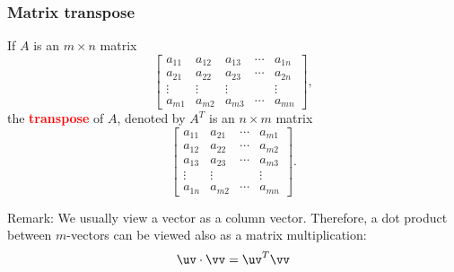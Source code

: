 \begin{frame}
  \frametitle{Matrix transpose}

  If $A$ is an $m\times n$ matrix
  {\footnotesize
  \[
  \left[
  \begin{array}{ccccc}
    a_{11} & a_{12} & a_{13} & \cdots & a_{1n} \\
    a_{21} & a_{22} & a_{23} & \cdots & a_{2n} \\
    \vdots & \vdots & \vdots & & \vdots \\
    a_{m1} & a_{m2} & a_{m3} & \cdots & a_{mn}
  \end{array}
  \right],
  \]
  }
  the \textcolor{red}{\bf transpose} of $A$, denoted by $A^{T}$ is
  an $n\times m$ matrix {\footnotesize
  \[
  \left[
  \begin{array}{cccc}
    a_{11} & a_{21} & \cdots & a_{m1} \\
    a_{12} & a_{22} & \cdots & a_{m2} \\
    a_{13} & a_{23} & \cdots & a_{m3} \\
    \vdots & \vdots & & \vdots \\
    a_{1n} & a_{m2} & \cdots & a_{mn}
  \end{array}
  \right].
  \]
  }
  \vspace{0.1in}

  \pause

  {\small
    Remark: We usually view a vector as a column vector.
    Therefore, a dot product between $m$-vectors can be viewed also as
    a matrix multiplication:
  \[
  \uv\cdot\vv = \uv^T\vv
  \]
  }
\end{frame}
